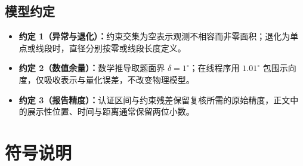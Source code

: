 \subsection{模型约定}
\begin{itemize}[itemindent=2em]
  \item \textbf{约定 1（异常与退化）：}约束交集为空表示观测不相容而非零面积；退化为单点或线段时，直径分别按零或线段长度定义。
  \item \textbf{约定 2（数值余量）：}数学推导取题面界 $\delta=1^\circ$；在线程序用 $1.01^\circ$ 包围示向度，仅吸收表示与量化误差，不改变物理模型。
  \item \textbf{约定 3（报告精度）：}认证区间与约束残差保留复核所需的原始精度，正文中的展示性位置、时间与距离通常保留两位小数。
\end{itemize}

\section{符号说明}
